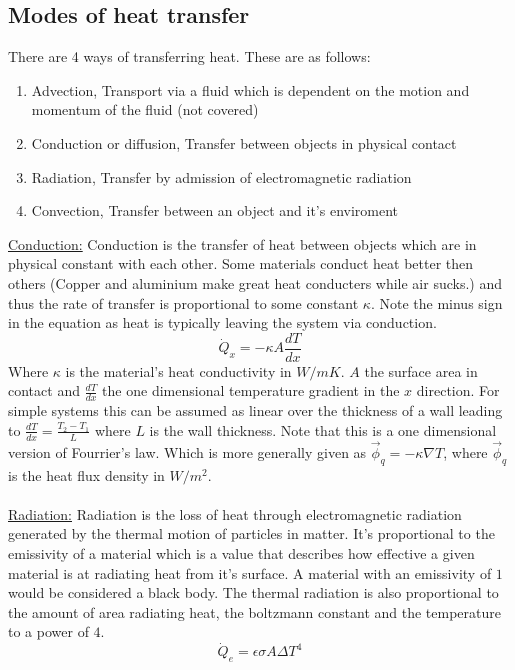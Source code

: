 \documentclass[11pt, a4paper]{article}
\begin{document}
\subsection{Modes of heat transfer}
There are 4 ways of transferring heat. These are as follows:
\begin{enumerate}
  \item Advection, Transport via a fluid which is dependent on the motion and momentum of the fluid (not covered)
  \item Conduction or diffusion, Transfer between objects in physical contact
  \item Radiation, Transfer by admission of electromagnetic radiation
  \item Convection, Transfer between an object and it's enviroment
\end{enumerate}
\underline{Conduction:}
Conduction is the transfer of heat between objects which are in physical constant with each other. Some materials conduct heat better then others (Copper and aluminium make great heat conducters while air sucks.) and thus the rate of transfer is proportional to some constant $\kappa$. Note the minus sign in the equation as heat is typically leaving the system via conduction.
\begin{equation}
  \dot{Q}_x = -\kappa A \frac{dT}{dx}
\end{equation}
Where $\kappa$ is the material's heat conductivity in $W/mK$. $A$ the surface area in contact and $\frac{dT}{dx}$ the one dimensional temperature gradient in the $x$ direction. For simple systems this can be assumed as linear over the thickness of a wall leading to $\frac{dT}{dx} = \frac{T_2 - T_1}{L}$ where $L$ is the wall thickness. Note that this is a one dimensional version of Fourrier's law. Which is more generally given as $\vec{\phi}_q = -\kappa \nabla T$, where $\vec{\phi}_q$ is the heat flux density in $W/m^2$.\\
\\
\underline{Radiation:}
Radiation is the loss of heat through electromagnetic radiation generated by the thermal motion of particles in matter. It's proportional to the emissivity of a material which is a value that describes how effective a given material is at radiating heat from it's surface. A material with an emissivity of $1$ would be considered a black body. The thermal radiation is also proportional to the amount of area radiating heat, the boltzmann constant and the temperature to a power of $4$.
\begin{equation}
  \dot{Q}_e = \epsilon \sigma A \Delta T^4
\end{equation}
\end{document}
